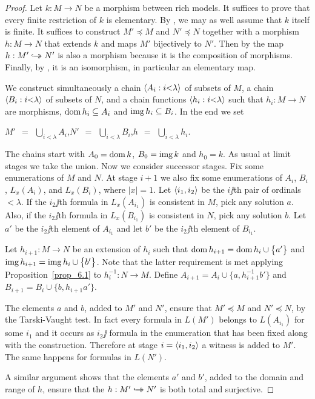 \documentclass[creche.tex]{subfiles}
\begin{document}
\begin{proof}
Let $k:M\to N$ be a morphism between rich models. It suffices to prove that every finite restriction of $k$ is elementary. By , we may as well assume that $k$ itself is finite. It suffices to construct $M'\preceq M$ and  $N'\preceq N$ together with a morphism $h:M\to N$ that extends $k$ and maps $M'$ bijectively to $N'$. Then by  the map $h:M'\hookrightarrow\mathrel{\mspace{-15mu}}\rightarrow N'$ is also a morphism because it is the composition of morphisms. Finally, by , it is an isomorphism, in particular an elementary map.

We construct simultaneously a chain $\langle A_i:i{<}\lambda\rangle$ of subsets of $M$, a chain $\langle B_i:i{<}\lambda\rangle$ of subsets of $N$, and a chain functions $\langle h_i:i{<}\lambda\rangle$ such that $h_i:M\to N$ are mor\-phisms, $\mathop{\rm dom} h_i\subseteq A_i$ and $\mathop{\rm img} h_i\subseteq B_i$. In the end we set

\hfil $\displaystyle M'\ \ =\ \ \bigcup_{i<\lambda}A_i$,\hfil $\displaystyle N'\ \ =\ \ \bigcup_{i<\lambda}B_i$,\hfil  $\displaystyle h\ \ =\ \ \bigcup_{i<\lambda}h_i$.

The chains start with $A_0=\mathop{\rm dom} k$, $B_0=\mathop{\rm img} k$ and $h_0=k$. As usual at limit stages we take the union. Now we consider successor stages. Fix some enumerations of $M$ and $N$. At stage $i+1$ we also fix some enumerations of $A_i$, $B_i$, $L_x(A_i)$, and $L_x(B_i)$, where $|x|=1$. Let $\langle i_1,i_2\rangle$ be the $i\jj$th pair of ordinals $<\lambda$. If the $i_2\jj$th formula in $L_x(A_{i_1})$ is consistent in $M$, pick any solution $a$. Also, if the $i_2\jj$th formula in $L_x(B_{i_1})$ is consistent in $N$, pick any solution $b$. Let $a'$ be the $i_2\jj$th element of $A_{i_1}$ and let $b'$ be the $i_2\jj$th element of $B_{i_1}$. 

Let $h_{i+1}:M\to N$ be an extension of $h_i$ such that $\mathop{\rm dom} h_{i+1}=\mathop{\rm dom} h_i\cup\big\{a'\big\}$ and $\mathop{\rm img} h_{i+1}=\mathop{\rm img} h_i\cup\big\{b'\big\}$. Note that the latter requirement is met applying Proposition~\ref{prop_6.1} to $h_i^{-1}:N\to M$. Define $A_{i+1}=A_i\cup\big\{a,h_{i+1}^{-1}b'\big\}$ and $B_{i+1}=B_i\cup\big\{b,h_{i+1}a'\big\}$.

The elements $a$ and $b$, added to $M'$ and $N'$, ensure that $M'\preceq M$ and $N'\preceq N$, by the Tarski-Vaught test. In fact every formula in $L(M')$ belongs to $L(A_{i_1})$ for some $i_1$ and it occurs as $i_2\jj$ formula in the enumeration that has been fixed along with the construction. Therefore at stage $i=\langle i_1,i_2\rangle$ a witness is added to $M'$. The same happens for formulas in $L(N')$. 

A similar argument shows that the elements $a'$ and $b'$, added to the domain and range of $h$, ensure that the $h:M'\hookrightarrow\mathrel{\mspace{-15mu}}\rightarrow N'$ is both total and surjective. 
\end{proof}
\end{document}
